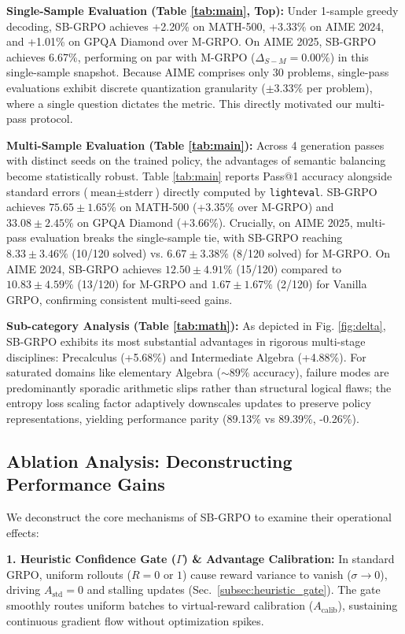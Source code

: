 \textbf{Single-Sample Evaluation (Table \ref{tab:main}, Top):} Under 1-sample greedy decoding, SB-GRPO achieves +2.20\% on MATH-500, +3.33\% on AIME 2024, and +1.01\% on GPQA Diamond over M-GRPO. On AIME 2025, SB-GRPO achieves 6.67\%, performing on par with M-GRPO ($\Delta_{S-M} = 0.00\%$) in this single-sample snapshot. Because AIME comprises only 30 problems, single-pass evaluations exhibit discrete quantization granularity ($\pm 3.33\%$ per problem), where a single question dictates the metric. This directly motivated our multi-pass protocol.

\textbf{Multi-Sample Evaluation (Table \ref{tab:main}):} Across 4 generation passes with distinct seeds on the trained policy, the advantages of semantic balancing become statistically robust. Table \ref{tab:main} reports Pass@1 accuracy alongside standard errors ($\text{mean} \pm \text{stderr}$) directly computed by \texttt{lighteval}. SB-GRPO achieves $75.65 \pm 1.65\%$ on MATH-500 (+3.35\% over M-GRPO) and $33.08 \pm 2.45\%$ on GPQA Diamond (+3.66\%). Crucially, on AIME 2025, multi-pass evaluation breaks the single-sample tie, with SB-GRPO reaching $8.33 \pm 3.46\%$ (10/120 solved) vs. $6.67 \pm 3.38\%$ (8/120 solved) for M-GRPO. On AIME 2024, SB-GRPO achieves $12.50 \pm 4.91\%$ (15/120) compared to $10.83 \pm 4.59\%$ (13/120) for M-GRPO and $1.67 \pm 1.67\%$ (2/120) for Vanilla GRPO, confirming consistent multi-seed gains.

\textbf{Sub-category Analysis (Table \ref{tab:math}):} As depicted in Fig. \ref{fig:delta}, SB-GRPO exhibits its most substantial advantages in rigorous multi-stage disciplines: Precalculus (+5.68\%) and Intermediate Algebra (+4.88\%). For saturated domains like elementary Algebra ($\sim 89\%$ accuracy), failure modes are predominantly sporadic arithmetic slips rather than structural logical flaws; the entropy loss scaling factor adaptively downscales updates to preserve policy representations, yielding performance parity (89.13\% vs 89.39\%, -0.26\%).

\subsection{Ablation Analysis: Deconstructing Performance Gains}
We deconstruct the core mechanisms of SB-GRPO to examine their operational effects:

\textbf{1. Heuristic Confidence Gate ($\Gamma$) \& Advantage Calibration:} In standard GRPO, uniform rollouts ($R=0$ or $1$) cause reward variance to vanish ($\sigma \to 0$), driving $A_{\text{std}}=0$ and stalling updates (Sec.~\ref{subsec:heuristic_gate}). The gate smoothly routes uniform batches to virtual-reward calibration ($A_{\text{calib}}$), sustaining continuous gradient flow without optimization spikes.

